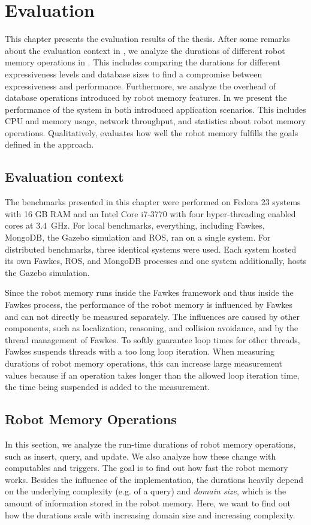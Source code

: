 \chapter{Evaluation}
\label{chap:evaluation}
This chapter presents the evaluation results of the thesis. After some
remarks about the evaluation context in , we
analyze the durations of different robot memory operations in
. This includes comparing the durations for
different expressiveness levels and database sizes to find a
compromise between expressiveness and performance. Furthermore, we
analyze the overhead of database operations introduced by robot memory
features. In  we present the performance of
the system in both introduced application scenarios. This includes CPU
and memory usage, network throughput, and statistics about robot
memory operations. Qualitatively,  evaluates
how well the robot memory fulfills the goals defined in the approach.

\section{Evaluation context}
\label{sec:eval-context}
The benchmarks presented in this chapter were performed on Fedora 23
systems with 16 GB RAM and an Intel Core i7-3770 with four hyper-threading enabled cores at
$3.4$~GHz. For local benchmarks, everything, including Fawkes, MongoDB,
the Gazebo simulation and ROS, ran on a single system. For distributed
benchmarks, three identical systems were used. Each system hosted its
own Fawkes, ROS, and MongoDB processes and one system additionally,
hosts the Gazebo simulation.

Since the robot memory runs inside the Fawkes framework and thus
inside the Fawkes process, the performance of the robot memory is
influenced by Fawkes and can not directly be measured separately. The
influences are caused by other components, such as localization,
reasoning, and collision avoidance, and by the thread management of
Fawkes. To softly guarantee loop times for other threads, Fawkes
suspends threads with a too long loop iteration. When measuring
durations of robot memory operations, this can increase large
measurement values because if an operation takes longer than the
allowed loop iteration time, the time being suspended is added to the
measurement.

\section{Robot Memory Operations}
\label{sec:op-durations}
In this section, we analyze the run-time durations of robot memory
operations, such as insert, query, and update. We also analyze how
these change with computables and triggers. The goal is to find out
how fast the robot memory works. Besides the influence of the
implementation, the durations heavily depend on the underlying
complexity (e.g. of a query) and \emph{domain size}, which is the
amount of information stored in the robot memory. Here, we want to
find out how the durations scale with increasing domain size and
increasing complexity.

